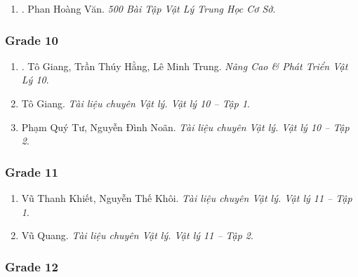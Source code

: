 \documentclass{article}
\begin{document}
\begin{enumerate}
	\item \cite{Van_500_BT_Vat_Ly_THCS}. Phan Hoàng Văn. \textit{500 Bài Tập Vật Lý Trung Học Cơ Sở}.\hfill{}
\end{enumerate}

\subsubsection{Grade 10}

\begin{enumerate}
	\item \cite{Giang_Hang_Trung2022}. Tô Giang, Trần Thúy Hằng, Lê Minh Trung. \textit{Nâng Cao \& Phát Triển Vật Lý 10}.\hfill{\sf[bought]}
	\item Tô Giang. \textit{Tài liệu chuyên Vật lý. Vật lý 10 -- Tập 1}.
	\item Phạm Quý Tư, Nguyễn Đình Noãn. \textit{Tài liệu chuyên Vật lý. Vật lý 10 -- Tập 2}.
\end{enumerate}

\subsubsection{Grade 11}

\begin{enumerate}
	\item Vũ Thanh Khiết, Nguyễn Thế Khôi. \textit{Tài liệu chuyên Vật lý. Vật lý 11 -- Tập 1}.
	\item Vũ Quang. \textit{Tài liệu chuyên Vật lý. Vật lý 11 -- Tập 2}.
\end{enumerate}

\subsubsection{Grade 12}
\end{document}
